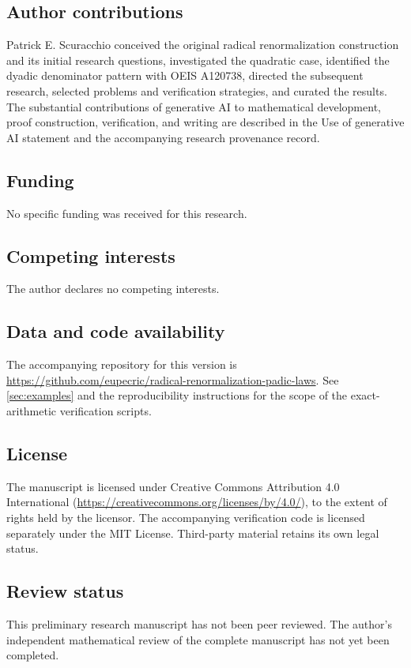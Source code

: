 \documentclass[11pt,reqno]{amsart}
\theoremstyle{definition}
\theoremstyle{remark}
\theoremstyle{plain}
\begin{document}
\subsection*{Author contributions}
Patrick E. Scuracchio conceived the original radical renormalization construction and its initial research questions, investigated the quadratic case, identified the dyadic denominator pattern with OEIS A120738, directed the subsequent research, selected problems and verification strategies, and curated the results. The substantial contributions of generative AI to mathematical development, proof construction, verification, and writing are described in the Use of generative AI statement and the accompanying research provenance record.

\subsection*{Funding}
No specific funding was received for this research.

\subsection*{Competing interests}
The author declares no competing interests.

\subsection*{Data and code availability}
The accompanying repository for this version is \url{https://github.com/eupecric/radical-renormalization-padic-laws}. See \cref{sec:examples} and the reproducibility instructions for the scope of the exact-arithmetic verification scripts.

\subsection*{License}
The manuscript is licensed under Creative Commons Attribution 4.0 International (\url{https://creativecommons.org/licenses/by/4.0/}), to the extent of rights held by the licensor. The accompanying verification code is licensed separately under the MIT License. Third-party material retains its own legal status.

\subsection*{Review status}
This preliminary research manuscript has not been peer reviewed. The author's independent mathematical review of the complete manuscript has not yet been completed.



\end{document}
